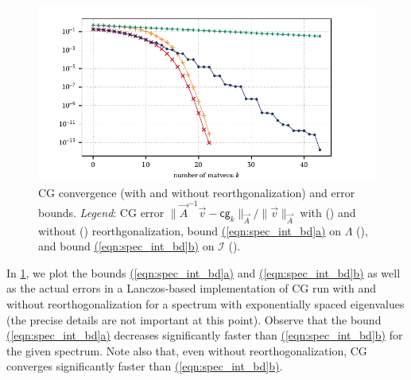\begin{figure}
    \begin{center}
        \includegraphics{imgs/ch1_unif_vs_spec.pdf} 
    \end{center}
    \caption[CG convergence (with and without reorthgonalization) and error bounds.]{%
    CG convergence (with and without reorthgonalization) and error bounds.
    \hspace{.25em}\emph{Legend}:
    CG error \( \| \vec{A}^{-1} \vec{v} - \textsf{cg}_k \|_{\vec{A}} / \| \vec{v} \|_{\vec{A}} \) with 
    ({\protect{}}) 
    and without
    ({\protect{}})
    reorthgonalization, 
    bound \href{eqn:spec_int_bd}{(\ref{eqn:spec_int_bd}a)} on \( \Lambda \) 
    ({\protect{}}),
    and bound \href{eqn:spec_int_bd}{(\ref{eqn:spec_int_bd}b)} on \( \mathcal{I} \) 
    ({\protect{}}).
    }
    \label{fig:ch1_unif_vs_spec}
\end{figure}

In \cref{fig:ch1_unif_vs_spec}, we plot the bounds \href{eqn:spec_int_bd}{(\ref{eqn:spec_int_bd}a)} and \href{eqn:spec_int_bd}{(\ref{eqn:spec_int_bd}b)} as well as the actual errors in a Lanczos-based implementation of CG run with and without reorthogonalization for a spectrum with exponentially spaced eigenvalues (the precise details are not important at this point).
Observe that the bound \href{eqn:spec_int_bd}{(\ref{eqn:spec_int_bd}a)} decreases significantly faster than \href{eqn:spec_int_bd}{(\ref{eqn:spec_int_bd}b)} for the given spectrum.
Note also that, even without reorthogonalization, CG converges significantly faster than \href{eqn:spec_int_bd}{(\ref{eqn:spec_int_bd}b)}.


